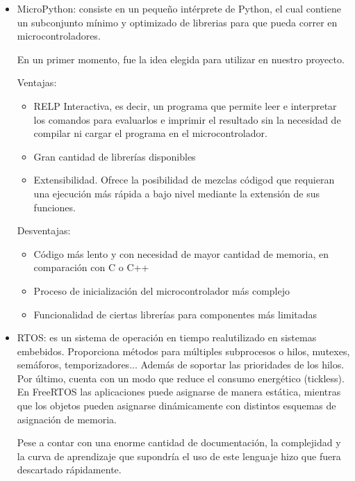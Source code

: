\documentclass[runningheads]{llncs}
\begin{document}
\begin{itemize}
    \item MicroPython: consiste en un pequeño intérprete de Python, el
    cual contiene un subconjunto mínimo y optimizado de librerias para
    que pueda correr en microcontroladores.
    
    En un primer momento, fue la idea elegida para utilizar en nuestro
    proyecto.
    
    
    Ventajas:
    \begin{itemize}
        \item RELP Interactiva, es decir, un programa que permite leer e
        interpretar los comandos para evaluarlos e imprimir el resultado
        sin la necesidad de compilar ni cargar el programa en el
        microcontrolador.
        
        \item Gran cantidad de librerías disponibles
        
        \item Extensibilidad. Ofrece la posibilidad de mezclas códigod
        que requieran una ejecución más rápida a bajo nivel mediante la
        extensión de sus funciones.
        
    \end{itemize}
    
    Desventajas:
    \begin{itemize}
        \item Código más lento y con necesidad de mayor cantidad de
        memoria, en comparación con C o C++
        
        \item Proceso de inicialización del microcontrolador más complejo
        \item Funcionalidad de ciertas librerías para componentes más limitadas
    \end{itemize}
     
    \item RTOS: es un sistema de operación en tiempo realutilizado en
    sistemas embebidos. Proporciona métodos para múltiples subprocesos o
    hilos, mutexes, semáforos, temporizadores... Además de soportar las
    prioridades de los hilos. Por último, cuenta con un modo que reduce
    el consumo energético (tickless). En FreeRTOS las aplicaciones puede
    asignarse de manera estática, mientras que los objetos pueden
    asignarse dinámicamente con distintos esquemas de asignación de
    memoria. 
    
    Pese a contar con una enorme cantidad de documentación, la
    complejidad y la curva de aprendizaje que supondría el uso de este
    lenguaje hizo que fuera descartado rápidamente.
    

\end{itemize}
\end{document}
